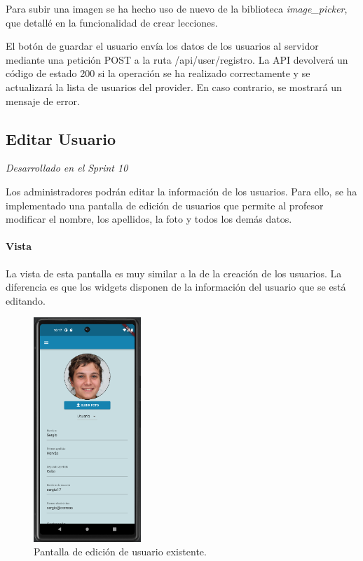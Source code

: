 Para subir una imagen se ha hecho uso de nuevo de la biblioteca \textit{image\_picker}, que detallé en la funcionalidad de crear lecciones.

El botón de guardar el usuario envía los datos de los usuarios al servidor mediante una petición POST a la ruta /api/user/registro. La API devolverá un código de estado 200 si la operación se ha realizado correctamente y se actualizará la lista de usuarios del provider. En caso contrario, se mostrará un mensaje de error.

\newpage

\subsection{Editar Usuario} 

\textit{Desarrollado en el Sprint 10}

Los administradores podrán editar la información de los usuarios. Para ello, se ha implementado una pantalla de edición de usuarios que permite al profesor modificar el nombre, los apellidos, la foto y todos los demás datos.

\paragraph*{Vista}
La vista de esta pantalla es muy similar a la de la creación de los usuarios. La diferencia es que los widgets disponen de la información del usuario que se está editando.

\begin{figure}[H]
  \centering
  \includegraphics[width=0.36\textwidth]{imagenes/c7/editarusuario.png}
  \caption{Pantalla de edición de usuario existente.} 
  \label{fig:edicion_usuario}
\end{figure}


